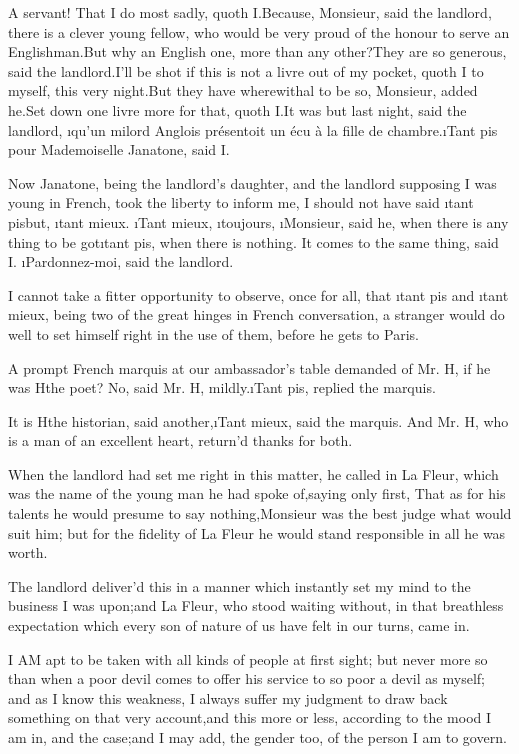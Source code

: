 \documentclass[twoside]{article}
\begin{document}
A servant!  That I do most sadly, quoth I.\tsk Because, Monsieur, said the
landlord, there is a clever young fellow, who would be very proud of the
honour to serve an Englishman.\tsk But why an English one, more than any
other?\tsk They are so generous, said the landlord.\tsk I’ll be shot if this is
not a livre out of my pocket, quoth I to myself, this very night.\tsk But
they have wherewithal to be so, Monsieur, added he.\tsk Set down one livre
more for that, quoth I.\tsk It was but last night, said the landlord, \i{qu’un
milord Anglois présentoit un écu à la fille de chambre}.\tsk \i{Tant pis pour
Mademoiselle Janatone}, said I.

Now Janatone, being the landlord’s daughter, and the landlord supposing I
was young in French, took the liberty to inform me, I should not have
said \i{tant pis}\tsk but, \i{tant mieux}.  \i{Tant mieux}, \i{toujours}, \i{Monsieur},
said he, when there is any thing to be got\tsk \i{tant pis}, when there is
nothing.  It comes to the same thing, said I.  \i{Pardonnez-moi}, said the
landlord.

I cannot take a fitter opportunity to observe, once for all, that \i{tant
pis} and \i{tant mieux}, being two of the great hinges in French
conversation, a stranger would do well to set himself right in the use of
them, before he gets to Paris.

A prompt French marquis at our ambassador’s table demanded of Mr. H\tsk , if
he was H\tsk  the poet?  No, said Mr. H\tsk , mildly.\tsk \i{Tant pis}, replied the
marquis.

It is H\tsk  the historian, said another,\tsk \i{Tant mieux}, said the marquis.
And Mr. H\tsk , who is a man of an excellent heart, return’d thanks for both.

When the landlord had set me right in this matter, he called in La Fleur,
which was the name of the young man he had spoke of,\tsk saying only first,
That as for his talents he would presume to say nothing,\tsk Monsieur was the
best judge what would suit him; but for the fidelity of La Fleur he would
stand responsible in all he was worth.

The landlord deliver’d this in a manner which instantly set my mind to
the business I was upon;\tsk and La Fleur, who stood waiting without, in that
breathless expectation which every son of nature of us have felt in our
turns, came in.






I AM apt to be taken with all kinds of people at first sight; but never
more so than when a poor devil comes to offer his service to so poor a
devil as myself; and as I know this weakness, I always suffer my judgment
to draw back something on that very account,\tsk and this more or less,
according to the mood I am in, and the case;\tsk and I may add, the gender
too, of the person I am to govern.
\end{document}
